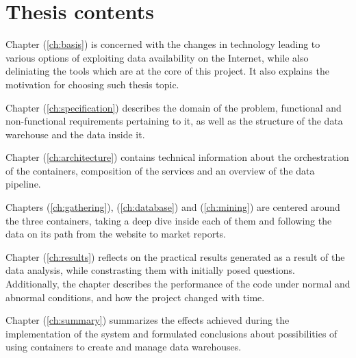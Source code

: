 \section{Thesis contents}
Chapter (\ref{ch:basis}) is concerned with the changes in technology leading to various options of exploiting data availability on the Internet, while also deliniating the tools which are at the core of this project. It also explains the motivation for choosing such thesis topic. \par
Chapter (\ref{ch:specification}) describes the domain of the problem, functional and non-functional requirements pertaining to it, as well as the structure of the data warehouse and the data inside it. \par
Chapter (\ref{ch:architecture}) contains technical information about the orchestration of the containers, composition of the services and an overview of the data pipeline. \par
Chapters (\ref{ch:gathering}), (\ref{ch:database}) and (\ref{ch:mining}) are centered around the three containers, taking a deep dive inside each of them and following the data on its path from the website to market reports. \par
Chapter (\ref{ch:results}) reflects on the practical results generated as a result of the data analysis, while constrasting them with initially posed questions. Additionally, the chapter describes the performance of the code under normal and abnormal conditions, and how the project changed with time. \par
Chapter (\ref{ch:summary}) summarizes the effects achieved during the implementation of the system and formulated conclusions about possibilities of using containers to create and manage data warehouses.